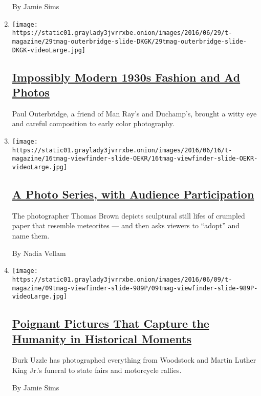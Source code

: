 \begin{enumerate}
  By Jamie Sims
\item
  \texttt{[image: https://static01.graylady3jvrrxbe.onion/images/2016/06/29/t-magazine/29tmag-outerbridge-slide-DKGK/29tmag-outerbridge-slide-DKGK-videoLarge.jpg]}

  \hypertarget{impossibly-modern-1930s-fashion-and-ad-photos}{%
  \subsection{\texorpdfstring{\href{/slideshow/2016/06/29/t-magazine/fashion/1930s-fashion-ad-photos.html}{Impossibly
  Modern 1930s Fashion and Ad
  Photos}}{Impossibly Modern 1930s Fashion and Ad Photos}}\label{impossibly-modern-1930s-fashion-and-ad-photos}}

  Paul Outerbridge, a friend of Man Ray's and Duchamp's, brought a witty
  eye and careful composition to early color photography.
\item
  \texttt{[image: https://static01.graylady3jvrrxbe.onion/images/2016/06/16/t-magazine/16tmag-viewfinder-slide-OEKR/16tmag-viewfinder-slide-OEKR-videoLarge.jpg]}

  \hypertarget{a-photo-series-with-audience-participation}{%
  \subsection{\texorpdfstring{\href{/slideshow/2016/06/16/t-magazine/paper-meteorites-photos.html}{A
  Photo Series, with Audience
  Participation}}{A Photo Series, with Audience Participation}}\label{a-photo-series-with-audience-participation}}

  The photographer Thomas Brown depicts sculptural still lifes of
  crumpled paper that resemble meteorites --- and then asks viewers to
  ``adopt'' and name them.

  By Nadia Vellam
\item
  \texttt{[image: https://static01.graylady3jvrrxbe.onion/images/2016/06/09/t-magazine/09tmag-viewfinder-slide-989P/09tmag-viewfinder-slide-989P-videoLarge.jpg]}

  \hypertarget{poignant-pictures-that-capture-the-humanity-in-historical-moments}{%
  \subsection{\texorpdfstring{\href{/slideshow/2016/06/09/t-magazine/burk-uzzle-photographs.html}{Poignant
  Pictures That Capture the Humanity in Historical
  Moments}}{Poignant Pictures That Capture the Humanity in Historical Moments}}\label{poignant-pictures-that-capture-the-humanity-in-historical-moments}}

  Burk Uzzle has photographed everything from Woodstock and Martin
  Luther King Jr.'s funeral to state fairs and motorcycle rallies.

  By Jamie Sims
\end{enumerate}

